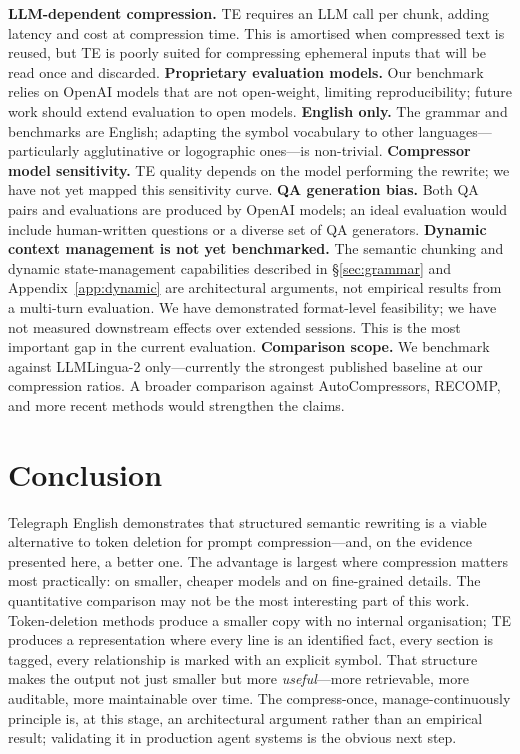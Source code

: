\documentclass{article}
\begin{document}
\textbf{LLM-dependent compression.} TE requires an LLM call per chunk, adding latency and cost at compression time. This is amortised when compressed text is reused, but TE is poorly suited for compressing ephemeral inputs that will be read once and discarded. \textbf{Proprietary evaluation models.} Our benchmark relies on OpenAI models that are not open-weight, limiting reproducibility; future work should extend evaluation to open models. \textbf{English only.} The grammar and benchmarks are English; adapting the symbol vocabulary to other languages---particularly agglutinative or logographic ones---is non-trivial. \textbf{Compressor model sensitivity.} TE quality depends on the model performing the rewrite; we have not yet mapped this sensitivity curve. \textbf{QA generation bias.} Both QA pairs and evaluations are produced by OpenAI models; an ideal evaluation would include human-written questions or a diverse set of QA generators. \textbf{Dynamic context management is not yet benchmarked.} The semantic chunking and dynamic state-management capabilities described in \S\ref{sec:grammar} and Appendix~\ref{app:dynamic} are architectural arguments, not empirical results from a multi-turn evaluation. We have demonstrated format-level feasibility; we have not measured downstream effects over extended sessions. This is the most important gap in the current evaluation. \textbf{Comparison scope.} We benchmark against LLMLingua-2 only---currently the strongest published baseline at our compression ratios. A broader comparison against AutoCompressors, RECOMP, and more recent methods would strengthen the claims.

\section{Conclusion}

Telegraph English demonstrates that structured semantic rewriting is a viable alternative to token deletion for prompt compression---and, on the evidence presented here, a better one. The advantage is largest where compression matters most practically: on smaller, cheaper models and on fine-grained details. The quantitative comparison may not be the most interesting part of this work. Token-deletion methods produce a smaller copy with no internal organisation; TE produces a representation where every line is an identified fact, every section is tagged, every relationship is marked with an explicit symbol. That structure makes the output not just smaller but more \emph{useful}---more retrievable, more auditable, more maintainable over time. The compress-once, manage-continuously principle is, at this stage, an architectural argument rather than an empirical result; validating it in production agent systems is the obvious next step.
\end{document}

